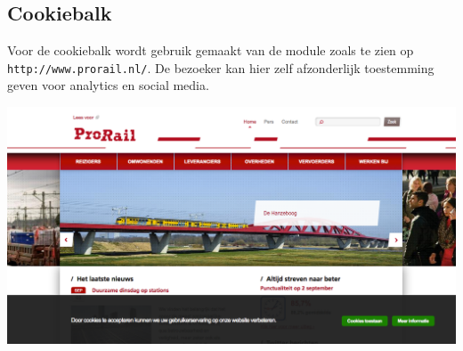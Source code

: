 \subsection{Cookiebalk}\label{cookiebalk}

Voor de cookiebalk wordt gebruik gemaakt van de  module zoals te zien op \texttt{http://www.prorail.nl/}. De bezoeker kan hier zelf afzonderlijk toestemming geven voor analytics en social media.

\begin{center}
\includegraphics[width=.7\textwidth]{img/prorail-cookiebalk.png}
\end{center}